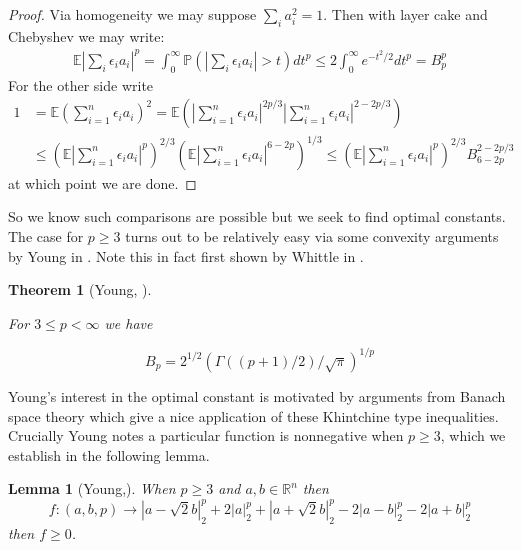 \documentclass[10pt]{article}
\newcommand{\Pp}{\mathbb{P}}
\newcommand{\E}{\mathbb{E}}
\newcommand{\1}{\textbf{1}}
\newcommand{\R}{\mathbb{R}}
\newcommand{\normOne}[1]{\left\lvert#1\right\rvert}
\newcommand{\lparen}{\left(}
\newcommand{\rparen}{\right)}
\newtheorem{theorem}{Theorem}[subsection]
\newtheorem{lemma}{Lemma}[subsection]
\theoremstyle{remark}
\theoremstyle{definition}
\begin{document}
\begin{proof}
	Via homogeneity we may suppose $\sum_i a_i^2 = 1$. Then with layer cake and Chebyshev we may write:
	\begin{align*}
		\E |\sum_i \epsilon_i a_i|^p = \int_0^{\infty} \Pp(|\sum_i \epsilon_i a_i | > t) dt^p \leq 2 \int_0^{\infty} e^{-t^2/2}dt^p = B_p^p
	\end{align*}
	For the other side write
	\begin{align*}
		1 &= \E\lparen\sum_{i=1}^n \epsilon_i a_i\rparen^2 = \E\lparen\normOne{\sum_{i=1}^n\epsilon_ia_i}^{2p/3}\normOne{\sum_{i=1}^n\epsilon_ia_i}^{2-2p/3}\rparen \\
		&\leq \lparen\E \normOne{\sum_{i=1}^n \epsilon_i a_i}^p\rparen^{2/3}\lparen\E \normOne{\sum_{i=1}^n \epsilon_i a_i}^{6-2p}\rparen^{1/3} \leq \lparen\E\normOne{\sum_{i=1}^n \epsilon_i a_i}^p\rparen^{2/3} B_{6-2p}^{2-2p/3}
	\end{align*}
	at which point we are done.
\end{proof}


So we know such comparisons are possible but we seek to find optimal constants. The case for $p \geq 3$ turns out to be relatively easy via some convexity arguments by Young in \cite{Y}. Note this in fact first shown by Whittle in \cite{W}.

\begin{theorem}[Young, \cite{Y}]\label{thm:RS2}

For $3 \leq p < \infty$ we have 

\begin{equation*}
	B_p = 2^{1/2}(\Gamma((p+1)/2)/\sqrt{\pi})^{1/p}
\end{equation*}
\end{theorem}

Young's interest in the optimal constant is motivated by arguments from Banach space theory which give a nice application of these Khintchine type inequalities. Crucially Young notes a particular function is nonnegative when $p \geq 3$, which we establish in the following lemma.

\begin{lemma}[Young,\cite{Y}]\label{lem:RS1}
	When $p \geq 3$ and $a,b \in \R^n$ then
	\begin{equation*}
		f : (a,b,p) \to \normOne{a-\sqrt{2}b}_2^p + 2 \normOne{a}_2^p + \normOne{a+\sqrt{2}b}_2^p - 2 \normOne{a-b}_2^p - 2\normOne{a+b}_2^p
	\end{equation*} then $f \geq 0$.
\end{lemma}
\end{document}
